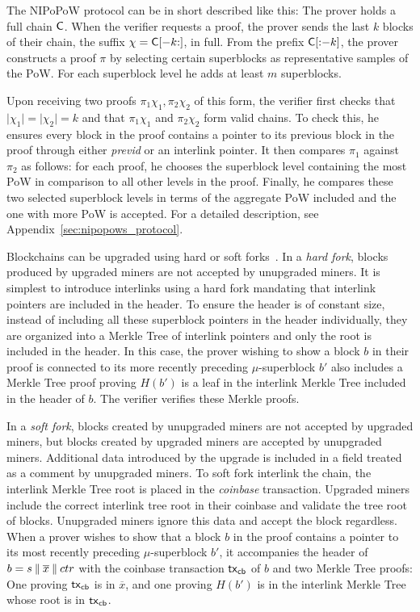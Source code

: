 The NIPoPoW protocol can be in short described like this: The prover holds a full chain
$\mathsf{C}$. When the verifier requests a proof, the prover sends the last $k$
blocks of their chain, the suffix $\chi = \mathsf{C}[-k{:}]$, in full. From the
prefix $\mathsf{C}[{:}{-k}]$, the prover constructs a proof $\pi$ by selecting
certain superblocks as representative samples of the PoW.
For each superblock level he adds at least $m$ superblocks.

Upon receiving two proofs $\pi_1\chi_1, \pi_2\chi_2$ of this form, the verifier
first checks that $\lvert \chi_1 \rvert = \lvert \chi_2 \rvert = k$ and that
$\pi_1 \chi_1$ and $\pi_2 \chi_2$ form valid chains. To check this, he
ensures every block in the
proof contains a pointer to its previous block in the proof through either
\emph{previd} or an interlink pointer. It then
compares $\pi_1$ against $\pi_2$ as follows: for each proof, he chooses the superblock level containing the most PoW in comparison to all other levels in the proof. Finally, he compares these two selected superblock levels in terms of the aggregate PoW included and the one with more PoW is accepted. For a detailed description, see Appendix~\ref{sec:nipopows_protocol}.

Blockchains can be upgraded using hard or soft
forks~\cite{buterinforks}. In a \emph{hard fork}, blocks produced by
upgraded miners are not accepted by unupgraded miners. It is simplest to
introduce interlinks using a hard fork mandating that interlink pointers are
included in the header.
To ensure the header is of constant size, instead of including all these
superblock pointers in the header individually, they are organized into a
Merkle Tree of interlink pointers and only the root is
included in the header. In this case, the prover wishing to
show a block $b$ in their proof is connected to its more recently preceding
$\mu$-superblock $b'$ also includes a Merkle Tree proof proving $H(b')$ is
a leaf in the interlink Merkle Tree included in the header of $b$.
The verifier verifies these Merkle proofs.

In a \emph{soft fork}, blocks created by unupgraded miners are not accepted by
upgraded miners, but blocks created by upgraded miners are accepted by
unupgraded miners. Additional data introduced by the upgrade is
included in a field treated as a comment by unupgraded miners.
To soft fork interlink the chain, the interlink Merkle Tree root is
placed in the \emph{coinbase} transaction. Upgraded
miners include the correct interlink tree root in their coinbase and validate
the tree root of blocks.
Unupgraded miners ignore this data and accept the block
regardless.
When a prover wishes to show that a
block $b$ in the proof contains a pointer to its most recently preceding
$\mu$-superblock $b'$, it accompanies the header of $b = s \mathbin{\|}
\overline{x} \mathbin{\|} ctr$ with the coinbase transaction $\mathsf{tx}_{\mathsf{cb}}$ of $b$ and
two Merkle Tree proofs: One proving $\mathsf{tx}_{\mathsf{cb}}$
is in $\overline{x}$, and one proving $H(b')$ is in the interlink
Merkle Tree whose root is in $\mathsf{tx}_{\mathsf{cb}}$.
